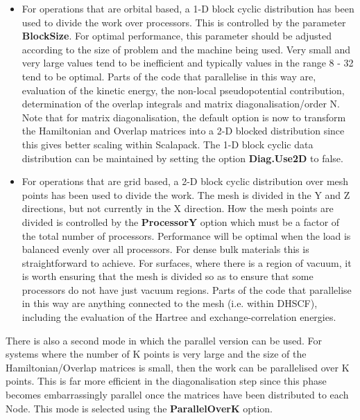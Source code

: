 \documentclass[11pt]{article}
\begin{document}
\begin{itemize}
\item
For operations that are orbital based, a 1-D block cyclic distribution
has been used to divide the work over processors. This is controlled
by the parameter {\bf BlockSize}.
For optimal performance, this parameter
should be adjusted according to the size of problem and the machine
being used. Very small and very large values tend to be inefficient
and typically values in the range 8 - 32 tend to be optimal. Parts of
the code that parallelise in this way are, evaluation of the kinetic
energy, the non-local pseudopotential contribution, determination of
the overlap integrals and matrix diagonalisation/order N. Note that 
for matrix diagonalisation, the default option is now to transform the
Hamiltonian and Overlap matrices into a 2-D blocked distribution since
this gives better scaling within Scalapack. The 1-D block cyclic
data distribution can be maintained by setting the option {\bf Diag.Use2D}
to false.

\item
For operations that are grid based, a 2-D block cyclic distribution
over mesh points has been used to divide the work. The mesh is divided
in the Y and Z directions, but not currently in the X direction. How
the mesh points are divided is controlled by the {\bf ProcessorY}
option which must be a factor of the total number of processors.
Performance will be optimal when the load is balanced evenly
over all processors. For dense bulk materials this is straightforward
to achieve. For surfaces, where there is a region of vacuum, it is
worth ensuring that the mesh is divided so as to ensure that some
processors do not have just vacuum regions. Parts of the code that
parallelise in this way are anything connected to the mesh (i.e. within
DHSCF), including the evaluation of the Hartree and exchange-correlation
energies.
\end{itemize}

There is also a second mode in which the parallel version can be used. For
systems where the number of K points is very large and the size of the
Hamiltonian/Overlap matrices is small, then the work can be parallelised
over K points. This is far more efficient in the diagonalisation step
since this phase becomes embarrassingly parallel once the matrices have
been distributed to each Node. This mode is selected using the 
{\bf ParallelOverK} 
option.
\end{document}
